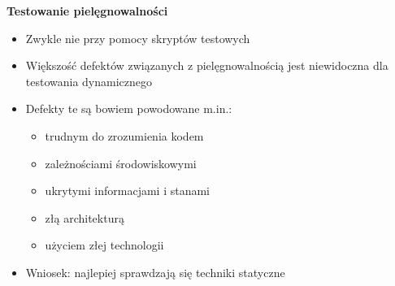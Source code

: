 \documentclass[../main.tex]{subfiles}
\begin{document}
    \textbf{Testowanie pielęgnowalności}\\
    \begin{itemize}
        \item Zwykle nie przy pomocy skryptów testowych
        \item Większość defektów związanych z pielęgnowalnością jest niewidoczna dla testowania dynamicznego
        \item Defekty te są bowiem powodowane m.in.:
        \begin{itemize}
            \item trudnym do zrozumienia kodem
            \item zależnościami środowiskowymi
            \item ukrytymi informacjami i stanami
            \item złą architekturą
            \item użyciem złej technologii
        \end{itemize}
        \item Wniosek: najlepiej sprawdzają się techniki statyczne
    \end{itemize}
\end{document}
